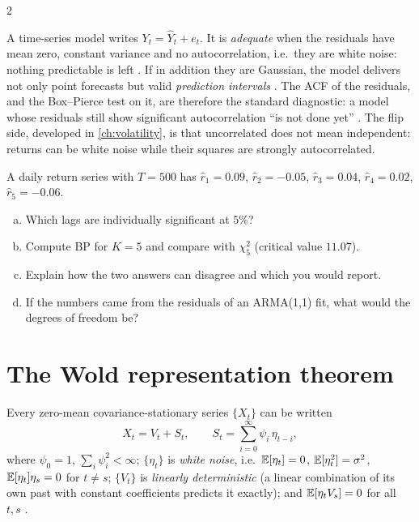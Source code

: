 \begin{paracol}{2}
\begin{finance}
A time-series model writes $Y_t=\hat Y_t+e_t$. It is \emph{adequate} when the residuals have mean zero,
constant variance and no autocorrelation, i.e.\ they are white noise: nothing predictable is left
. If in addition they are Gaussian, the model delivers not only point
forecasts but valid \emph{prediction intervals} . The ACF of the residuals, and the
Box--Pierce test on it, are therefore the standard diagnostic: a model whose residuals still show
significant autocorrelation ``is not done yet'' . The flip side, developed in
\cref{ch:volatility}, is that uncorrelated does not mean independent: returns can be white noise while
their squares are strongly autocorrelated.
\end{finance}

\begin{exercise}\label{ch09:ex-x-bp}
A daily return series with $T=500$ has $\hat r_1=0.09$, $\hat r_2=-0.05$, $\hat r_3=0.04$, $\hat r_4=0.02$, $\hat r_5=-0.06$.
\begin{enumerate}[(a)]
  \item Which lags are individually significant at $5\%$?
  \item Compute BP for $K=5$ and compare with $\chi^2_5$ (critical value $11.07$).
  \item Explain how the two answers can disagree and which you would report.
  \item If the numbers came from the residuals of an ARMA(1,1) fit, what would the degrees of freedom be?
\end{enumerate}
\end{exercise}

\section{The Wold representation theorem}\label{ch09:sec-wold}

\begin{theorem}\label{ch09:thm-wold}
Every zero-mean covariance-stationary series $\{X_t\}$ can be written
\begin{equation}\label{ch09:eq-wold}
  X_t=V_t+S_t,\qquad S_t=\sum_{i=0}^{\infty}\psi_i\,\eta_{t-i},
\end{equation}
where $\psi_0=1$, $\sum_i\psi_i^2<\infty$; $\{\eta_t\}$ is \emph{white noise}, i.e.\ $\mathbb{E}[\eta_t]=0$,
$\mathbb{E}[\eta_t^2]=\sigma^2$, $\mathbb{E}[\eta_t]\eta_s=0$ for $t\ne s$; $\{V_t\}$ is \emph{linearly deterministic} (a linear
combination of its own past with constant coefficients predicts it exactly); and
$\mathbb{E}[\eta_tV_s]=0$ for all $t,s$ .
\end{theorem}


\end{paracol}
